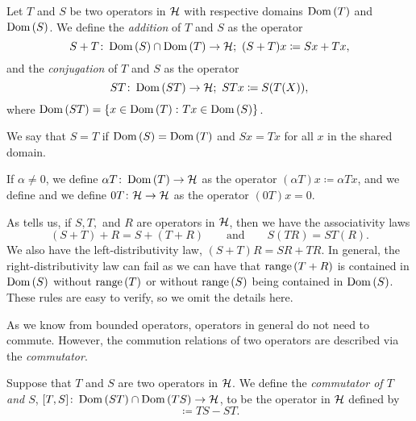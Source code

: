 \begin{definition}
  Let $T$ and $S$ be two operators in $\mathcal{H}$ with respective domains $\operatorname{Dom}\left(T\right)$ and $\operatorname{Dom}\left(S\right)$. We define the {\emph{addition}} of $T$ and $S$ as the operator
  \begin{equation*}
    S +  T \colon \operatorname{Dom}\left(S\right) \cap \operatorname{Dom}\left(T\right) \to \mathcal{H};\,\, (S+T)x \coloneqq Sx + Tx,
  \end{equation*}
  and the {\emph{conjugation}} of $T$ and $S$ as the operator
  \begin{equation*}
    ST \colon \operatorname{Dom}\left(ST\right) \to \mathcal{H}; \,\, STx \coloneqq S(T(X)),
  \end{equation*}
  where $\operatorname{Dom}\left(ST\right) = \left\{x \in \operatorname{Dom}\left(T\right) \colon Tx \in \operatorname{Dom}\left(S\right)\right\}$.

  \medskip

  We say that $S = T$ if $\operatorname{Dom}\left(S\right) = \operatorname{Dom}\left(T\right)$ and $Sx = Tx$ for all $x$ in the shared domain.

  \medskip
  If $\alpha \neq 0$, we define $\alpha T \colon \operatorname{Dom}\left(T\right) \to \mathcal{H}$ as the operator $(\alpha T)x \coloneqq \alpha Tx$, and we define and we define $0T \colon \mathcal{H} \to \mathcal{H}$ as the operator $(0T)x = 0$.
\end{definition}
\begin{remark}
  As {\cite[Definitions 13.1]{rudin}} tells us, if $S, T,$ and $R$ are operators in $\mathcal{H}$, then we have the associativity laws
  \begin{equation*}
      (S + T) + R = S + (T + R) \qquad \text{and} \qquad S(TR) = ST(R).
  \end{equation*}
  We also have the left-distributivity law, $(S + T)R = SR + TR.$ In general, the right-distributivity law can fail as we can have that $\operatorname{range}\left(T + R\right)$ is contained in $\operatorname{Dom}\left(S\right)$ without $\operatorname{range}\left(T\right)$ or without $\operatorname{range}\left(S\right)$ being contained in $\operatorname{Dom}\left(S\right)$. These rules are easy to verify, so we omit the details here.
\end{remark}

As we know from bounded operators, operators in general do not need to commute. However, the commution relations of two operators are described via the {\emph{commutator}}.

\begin{definition}\label{lbl_def_commutator}
  Suppose that $T$ and $S$ are two operators in $\mathcal{H}$. We define the {\emph{commutator of $T$ and $S$}}, $[T, S] \colon \operatorname{Dom}\left(ST\right) \cap \operatorname{Dom}\left(TS\right) \to \mathcal{H}$, to be the operator in $\mathcal{H}$ defined by
  \begin{equation*}
    [T, S] \coloneqq TS - ST.
  \end{equation*}
\end{definition}

